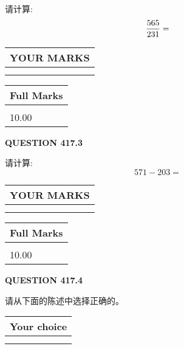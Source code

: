 \documentclass{ctexart}
\begin{document}
  
 
请计算:
\begin{equation}
\frac { %
565 }  {  %
231} = \nonumber
\end{equation}
 

 

 
  
\vspace{0.2in}
  
\noindent\begin{tabular}{|l|}
\hline
 YOUR MARKS  \\
\hline
 \\ 
 \\ 
\hline
\end{tabular}
\hspace{0.05in} \begin{tabular}{|l|}
\hline
 Full Marks  \\
\hline
 \\ 
10.00 \\
\hline
\end{tabular}
{\textbf{\Large{QUESTION
417.3 
}}}
  
  
 
请计算:
\begin{equation}
571 -   %
203 = \nonumber
\end{equation}
 

 

 
  
\vspace{0.2in}
  
\noindent\begin{tabular}{|l|}
\hline
 YOUR MARKS  \\
\hline
 \\ 
 \\ 
\hline
\end{tabular}
\hspace{0.05in} \begin{tabular}{|l|}
\hline
 Full Marks  \\
\hline
 \\ 
10.00 \\
\hline
\end{tabular}
{\textbf{\Large{QUESTION
417.4 
}}}
  
  
请从下面的陈述中选择正确的。
  
  
\noindent\hspace{3.0in} \begin{tabular}{|l|}
\hline
Your choice \\
\hline
 \\ 
 \\ 
\hline
\end{tabular}
  
\end{document}
